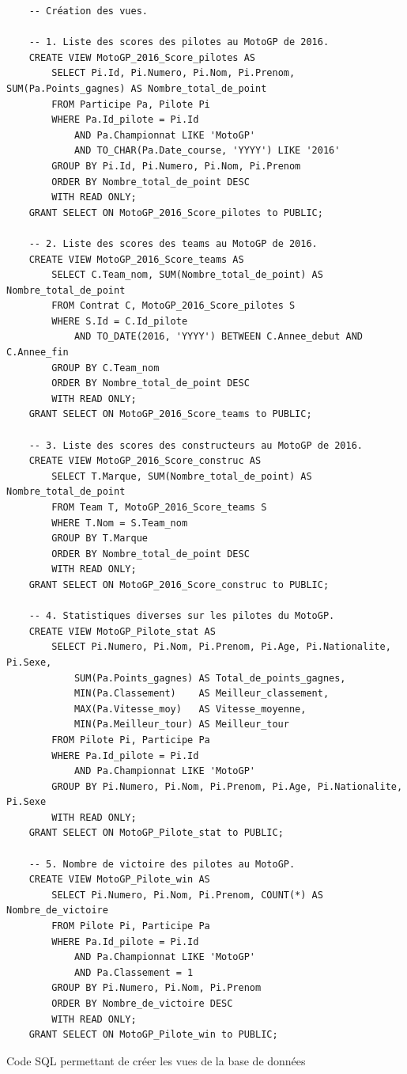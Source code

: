\documentclass[12pt,a4paper]{article}
\newenvironment{code}{\captionsetup{type=listing}}{}
\begin{document}
\begin{code}
    \begin{verbatim}
    -- Création des vues.

    -- 1. Liste des scores des pilotes au MotoGP de 2016.
    CREATE VIEW MotoGP_2016_Score_pilotes AS
        SELECT Pi.Id, Pi.Numero, Pi.Nom, Pi.Prenom, SUM(Pa.Points_gagnes) AS Nombre_total_de_point
        FROM Participe Pa, Pilote Pi
        WHERE Pa.Id_pilote = Pi.Id
            AND Pa.Championnat LIKE 'MotoGP'
            AND TO_CHAR(Pa.Date_course, 'YYYY') LIKE '2016'
        GROUP BY Pi.Id, Pi.Numero, Pi.Nom, Pi.Prenom
        ORDER BY Nombre_total_de_point DESC
        WITH READ ONLY;
    GRANT SELECT ON MotoGP_2016_Score_pilotes to PUBLIC;

    -- 2. Liste des scores des teams au MotoGP de 2016.
    CREATE VIEW MotoGP_2016_Score_teams AS
        SELECT C.Team_nom, SUM(Nombre_total_de_point) AS Nombre_total_de_point
        FROM Contrat C, MotoGP_2016_Score_pilotes S
        WHERE S.Id = C.Id_pilote
            AND TO_DATE(2016, 'YYYY') BETWEEN C.Annee_debut AND C.Annee_fin
        GROUP BY C.Team_nom
        ORDER BY Nombre_total_de_point DESC
        WITH READ ONLY;
    GRANT SELECT ON MotoGP_2016_Score_teams to PUBLIC;

    -- 3. Liste des scores des constructeurs au MotoGP de 2016.
    CREATE VIEW MotoGP_2016_Score_construc AS
        SELECT T.Marque, SUM(Nombre_total_de_point) AS Nombre_total_de_point
        FROM Team T, MotoGP_2016_Score_teams S
        WHERE T.Nom = S.Team_nom
        GROUP BY T.Marque
        ORDER BY Nombre_total_de_point DESC
        WITH READ ONLY;
    GRANT SELECT ON MotoGP_2016_Score_construc to PUBLIC;

    -- 4. Statistiques diverses sur les pilotes du MotoGP.
    CREATE VIEW MotoGP_Pilote_stat AS
        SELECT Pi.Numero, Pi.Nom, Pi.Prenom, Pi.Age, Pi.Nationalite, Pi.Sexe,
            SUM(Pa.Points_gagnes) AS Total_de_points_gagnes,
            MIN(Pa.Classement)    AS Meilleur_classement,
            MAX(Pa.Vitesse_moy)   AS Vitesse_moyenne,
            MIN(Pa.Meilleur_tour) AS Meilleur_tour
        FROM Pilote Pi, Participe Pa
        WHERE Pa.Id_pilote = Pi.Id
            AND Pa.Championnat LIKE 'MotoGP'
        GROUP BY Pi.Numero, Pi.Nom, Pi.Prenom, Pi.Age, Pi.Nationalite, Pi.Sexe
        WITH READ ONLY;
    GRANT SELECT ON MotoGP_Pilote_stat to PUBLIC;

    -- 5. Nombre de victoire des pilotes au MotoGP.
    CREATE VIEW MotoGP_Pilote_win AS
        SELECT Pi.Numero, Pi.Nom, Pi.Prenom, COUNT(*) AS Nombre_de_victoire
        FROM Pilote Pi, Participe Pa
        WHERE Pa.Id_pilote = Pi.Id
            AND Pa.Championnat LIKE 'MotoGP'
            AND Pa.Classement = 1
        GROUP BY Pi.Numero, Pi.Nom, Pi.Prenom
        ORDER BY Nombre_de_victoire DESC
        WITH READ ONLY;
    GRANT SELECT ON MotoGP_Pilote_win to PUBLIC;
    \end{verbatim}
    \caption{Code SQL permettant de créer les vues de la base de données}
    \label{lst.create}
\end{code}
\end{document}

